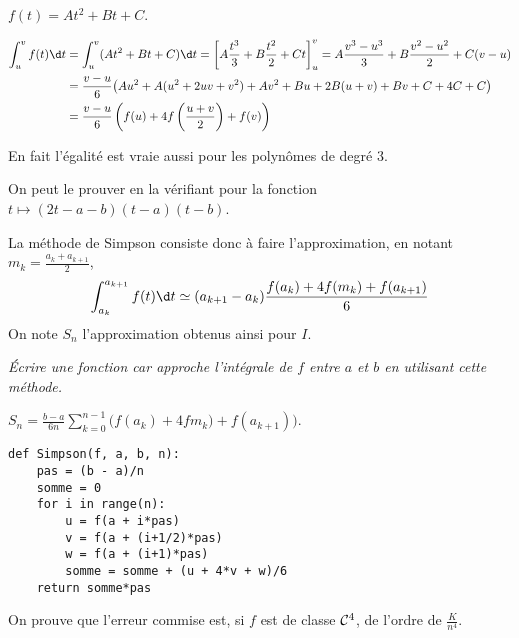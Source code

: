 \begin{Answer}$f(t) = A t^2 + B t + C$.

\begin{align*}
  \int_u^v f(t) \d t 
  & =\int_u^v (A t^2 + B t + C)\d t 
  =\left[A \frac {t^3}3 + B \frac {t^2}2 + C t\right]_u^v
  = A \frac {v^3 - u^3}3 + B \frac {v^2 - u^2}2 + C(v - u)
  \\&
  =\frac{v - u}6 \bigl(A u^2 + A(u^2+2uv +v^2) +Av^2 + Bu + 2B(u+v) + Bv + C +4 C +C\bigr)
  \\&
    =\frac {v - u}6 \left(f(u) + 4 f\left(\frac{u+v}2\right) + f(v)\right)
\end{align*}

En fait l'égalité est vraie aussi pour les polynômes de degré 3.

On peut le prouver en la vérifiant pour la fonction $t\mapsto (2t-a-b)(t-a)(t-b)$.
\newpage
\end{Answer}
La méthode de Simpson consiste donc à faire l'approximation, en notant $\displaystyle m_k = \frac{a_k+a_{k+1}}{2}$,
\[\int_{a_k}^{a_{k+1}} f(t)\d t \simeq (a_{k+1} - a_k)\frac{f(a_k)+4f(m_k)+f(a_{k+1})}{6}\]
On note $S_n$ l'approximation obtenus ainsi pour $I$.
\begin{Exercise}\it
Écrire une fonction  car approche l'intégrale de $f$ entre $a$ et $b$ en utilisant cette méthode.
\end{Exercise}
\begin{Answer}
$\displaystyle S_n = \frac{b-a}{6n}\sum_{k =0}^{n-1} 
\bigl(f(a_k) + 4fm_k) + f(a_{k+1})\bigr)$.
\begin{lstlisting}
def Simpson(f, a, b, n):
    pas = (b - a)/n
    somme = 0
    for i in range(n):
        u = f(a + i*pas)
        v = f(a + (i+1/2)*pas)
        w = f(a + (i+1)*pas)
        somme = somme + (u + 4*v + w)/6
    return somme*pas
\end{lstlisting}
\end{Answer}
On prouve que l'erreur commise est, si $f$ est de classe ${\cal C}^4$, de l'ordre de $\frac{K}{n^4}$.

